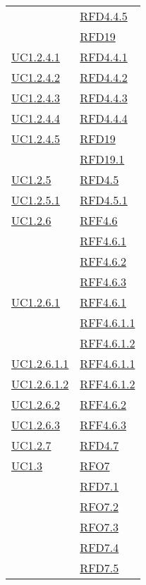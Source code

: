 \begin{longtable}{|>{\centering}m{5cm}|m{5cm}<{\centering}|}
& \hyperlink{RFD4.4.5}{RFD4.4.5}\\
& \hyperlink{RFD19}{RFD19}\\ \hline
\hyperref[UC1.2.4.1]{UC1.2.4.1} & \hyperlink{RFD4.4.1}{RFD4.4.1}\\ \hline
\hyperref[UC1.2.4.2]{UC1.2.4.2} & \hyperlink{RFD4.4.2}{RFD4.4.2}\\ \hline
\hyperref[UC1.2.4.3]{UC1.2.4.3} & \hyperlink{RFD4.4.3}{RFD4.4.3}\\ \hline
\hyperref[UC1.2.4.4]{UC1.2.4.4} & \hyperlink{RFD4.4.4}{RFD4.4.4}\\ \hline
\hyperref[UC1.2.4.5]{UC1.2.4.5} & \hyperlink{RFD19}{RFD19}\\
& \hyperlink{RFD19.1}{RFD19.1}\\ \hline
\hyperref[UC1.2.5]{UC1.2.5} & \hyperlink{RFD4.5}{RFD4.5}\\ \hline
\hyperref[UC1.2.5.1]{UC1.2.5.1} & \hyperlink{RFD4.5.1}{RFD4.5.1}\\ \hline
\hyperref[UC1.2.6]{UC1.2.6} & \hyperlink{RFF4.6}{RFF4.6}\\
& \hyperlink{RFF4.6.1}{RFF4.6.1}\\
& \hyperlink{RFF4.6.2}{RFF4.6.2}\\
& \hyperlink{RFF4.6.3}{RFF4.6.3}\\ \hline
\hyperref[UC1.2.6.1]{UC1.2.6.1} & \hyperlink{RFF4.6.1}{RFF4.6.1}\\
& \hyperlink{RFF4.6.1.1}{RFF4.6.1.1}\\
& \hyperlink{RFF4.6.1.2}{RFF4.6.1.2}\\ \hline
\hyperref[UC1.2.6.1.1]{UC1.2.6.1.1} & \hyperlink{RFF4.6.1.1}{RFF4.6.1.1}\\ \hline
\hyperref[UC1.2.6.1.2]{UC1.2.6.1.2} & \hyperlink{RFF4.6.1.2}{RFF4.6.1.2}\\ \hline
\hyperref[UC1.2.6.2]{UC1.2.6.2} & \hyperlink{RFF4.6.2}{RFF4.6.2}\\ \hline
\hyperref[UC1.2.6.3]{UC1.2.6.3} & \hyperlink{RFF4.6.3}{RFF4.6.3}\\ \hline
\hyperref[UC1.2.7]{UC1.2.7} & \hyperlink{RFD4.7}{RFD4.7}\\ \hline
\hyperref[UC1.3]{UC1.3} & \hyperlink{RFO7}{RFO7}\\
& \hyperlink{RFD7.1}{RFD7.1}\\
& \hyperlink{RFO7.2}{RFO7.2}\\
& \hyperlink{RFO7.3}{RFO7.3}\\
& \hyperlink{RFD7.4}{RFD7.4}\\
& \hyperlink{RFD7.5}{RFD7.5}\\

\end{longtable}

